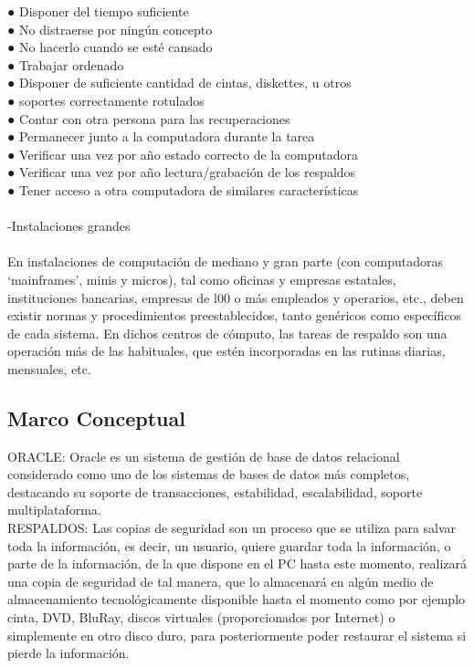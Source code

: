 \documentclass[12pt,letterpaper]{article}
\begin{document}
●	Disponer del tiempo suficiente\\
●	No distraerse por ningún concepto\\
●	No hacerlo cuando se esté cansado\\
●	Trabajar ordenado\\
●	Disponer de suficiente cantidad de cintas, diskettes, u otros \\
●	soportes correctamente rotulados\\
●	Contar con otra persona para las recuperaciones\\
●	Permanecer junto a la computadora durante la  tarea \\
●	Verificar una vez por año estado correcto de la computadora \\
●	Verificar una vez por año lectura/grabación de los respaldos \\
●	Tener acceso a otra computadora de similares características  \\\\


-Instalaciones grandes \\\\

En instalaciones de computación de mediano y gran parte (con computadoras ‘mainframes’, minis y micros), tal como oficinas y empresas estatales, instituciones bancarias, empresas de l00 o más empleados y operarios, etc., deben existir normas y procedimientos preestablecidos, tanto genéricos como específicos de cada sistema. En dichos centros de cómputo, las tareas de respaldo son una operación más de las habituales, que estén incorporadas en las rutinas diarias, mensuales, etc. \\


\subsection{Marco Conceptual}

 ORACLE: Oracle es un sistema de gestión de base de datos relacional considerado como uno de los sistemas de bases de datos más completos, destacando su soporte de transacciones, estabilidad, escalabilidad, soporte multiplataforma. \\

 RESPALDOS: Las copias de seguridad son un proceso que se utiliza para salvar toda la información, es decir, un usuario, quiere guardar toda la información, o parte de la información, de la que dispone en el PC hasta este momento, realizará una copia de seguridad de tal manera, que lo almacenará en algún medio de almacenamiento tecnológicamente disponible hasta el momento como por ejemplo cinta, DVD, BluRay, discos virtuales (proporcionados por Internet) o simplemente en otro disco duro, para posteriormente poder restaurar el sistema si pierde la información.\\
\end{document}
